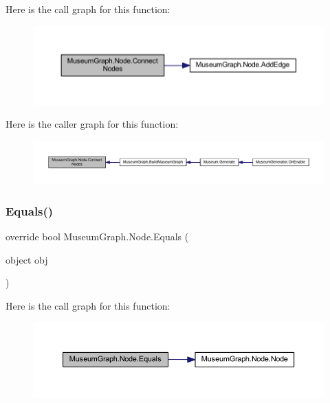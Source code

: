 Here is the call graph for this function\+:\nopagebreak
\begin{figure}[H]
\begin{center}
\leavevmode
\includegraphics[width=350pt]{class_museum_graph_1_1_node_afc85f1140ee37f6365863f34ac3482bc_cgraph}
\end{center}
\end{figure}
Here is the caller graph for this function\+:
\nopagebreak
\begin{figure}[H]
\begin{center}
\leavevmode
\includegraphics[width=350pt]{class_museum_graph_1_1_node_afc85f1140ee37f6365863f34ac3482bc_icgraph}
\end{center}
\end{figure}
\mbox{\label{class_museum_graph_1_1_node_a341a560512b816a8af059813480ef9da}} 
\subsubsection{\texorpdfstring{Equals()}{Equals()}}
{\footnotesize\ttfamily override bool Museum\+Graph.\+Node.\+Equals (\begin{DoxyParamCaption}\item[{object}]{obj }\end{DoxyParamCaption})}

Here is the call graph for this function\+:\nopagebreak
\begin{figure}[H]
\begin{center}
\leavevmode
\includegraphics[width=350pt]{class_museum_graph_1_1_node_a341a560512b816a8af059813480ef9da_cgraph}
\end{center}
\end{figure}
\mbox{\label{class_museum_graph_1_1_node_adcc32750b64d61121c1431ffc41b0f8d}} 
